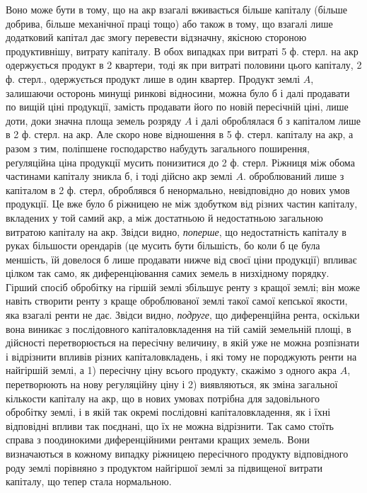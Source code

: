 \parcont{}  %
Воно може бути в тому, що на акр взагалі вживається більше капіталу (більше
добрива, більше механічної праці тощо) або також в тому, що взагалі лише
додатковий капітал дає змогу перевести відзначну, якісною стороною продуктивнішу,
витрату капіталу. В обох випадках при витраті 5 ф. стерл. на акр одержується
продукт в 2  квартери, тоді як при витраті половини цього капіталу,
2  ф. стерл., одержується продукт лише в один квартер. Продукт землі $A$,
залишаючи осторонь минущі ринкові відносини, можна було б і далі продавати
по вищій ціні продукції, замість продавати його по новій пересічній
ціні, лише доти, доки значна площа земель розряду $A$ і далі оброблялася б
з капіталом лише в 2  ф. стерл. на акр. Але скоро нове відношення
в 5 ф. стерл. капіталу на акр, а разом з тим, поліпшене господарство набудуть
загального поширення, реґуляційна ціна продукції мусить понизитися до 2  ф.
стерл. Ріжниця між обома частинами капіталу зникла б, і тоді дійсно акр землі $A$.
оброблюваний лише з капіталом в 2  ф. стерл, оброблявся б ненормально,
невідповідно до нових умов продукції. Це вже було б ріжницею не між здобутком від
різних частин капіталу, вкладених у той самий акр, а між достатньою й недостатньою
загальною витратою капіталу на акр. Звідси видно, \emph{поперше}, що недостатність
капіталу в руках більшости орендарів (це мусить бути більшість, бо коли б це
була меншість, їй довелося б лише продавати нижче від своєї ціни продукції)
впливає цілком так само, як диференціювання самих земель в низхідному порядку.
Гірший спосіб обробітку на гіршій землі збільшує ренту з кращої землі;
він може навіть створити ренту з краще оброблюваної землі такої самої кепської
якости, яка взагалі ренти не дає. Звідси видно, \emph{подруге}, що диференційна рента,
оскільки вона виникає з послідовного капіталовкладення на тій самій земельній
площі, в дійсності перетворюється на пересічну величину, в якій уже не можна
розпізнати і відрізнити впливів різних капіталовкладень, і які тому не породжують
ренти на найгіршій землі, а 1) пересічну ціну всього продукту, скажімо
з одного акра $A$, перетворюють на нову регуляційну ціну і 2) виявляються, як
зміна загальної кількости капіталу на акр, що в нових умовах потрібна для
задовільного обробітку землі, і в якій так окремі послідовні капіталовкладення, як і
їхні відповідні впливи так поєднані, що їх не можна відрізнити. Так само стоїть
справа з поодинокими диференційними рентами кращих земель. Вони визначаються
в кожному випадку ріжницею пересічного продукту відповідного роду землі порівняно
з продуктом найгіршої землі за підвищеної витрати капіталу, що тепер
стала нормальною.

